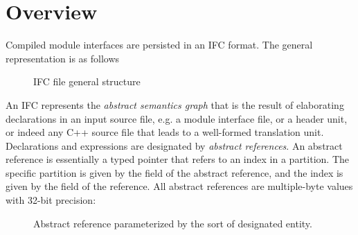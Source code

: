 \label{sec:structure}

\section{Overview}
\label{sec:overview}

Compiled module interfaces are persisted in an IFC format.  The general
representation is as follows
\begin{figure}[hbp]
  \centering
  \caption{IFC file general structure}
  \label{fig:ifc-file-overview}
\end{figure}

\noindent
An IFC represents the \emph{abstract semantics graph} that is the result
of elaborating declarations in an input source file, e.g. a module interface file,
 or a header unit, or indeed any C++ source file that leads to a 
well-formed translation unit.
Declarations and expressions are designated by \emph{abstract references}.  An
abstract reference is essentially a typed pointer that refers to an index in a
partition.  The specific partition is given by the  field of the abstract
reference, and the index is given by the  field of the reference.  All
abstract references are multiple-byte values with 32-bit precision:
%
\begin{figure}[H]
  \centering
	\begin{BasicAbstractReferenceLayout}{32}
	\end{BasicAbstractReferenceLayout} 
  \caption{Abstract reference parameterized by the sort of designated entity.}
  \label{fig:ifc-abstract-reference}
\end{figure}
%

